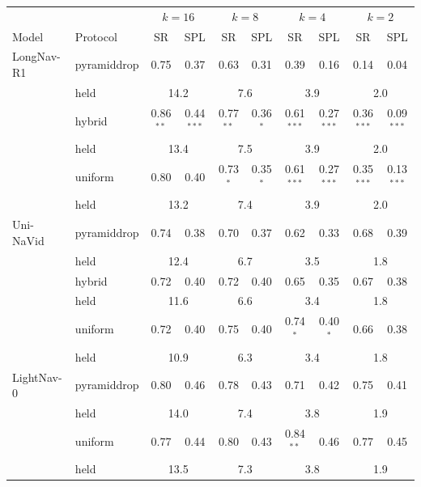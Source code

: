 \begin{tabular}{llcccccccc}
\toprule
 & & \multicolumn{2}{c}{$k=16$} & \multicolumn{2}{c}{$k=8$} & \multicolumn{2}{c}{$k=4$} & \multicolumn{2}{c}{$k=2$} \\
Model & Protocol & SR & SPL & SR & SPL & SR & SPL & SR & SPL \\
\midrule
LongNav-R1 & pyramiddrop & 0.75 & 0.37 & 0.63 & 0.31 & 0.39 & 0.16 & 0.14 & 0.04 \\
 & \quad held & \multicolumn{2}{c}{14.2} & \multicolumn{2}{c}{7.6} & \multicolumn{2}{c}{3.9} & \multicolumn{2}{c}{2.0} \\
 & hybrid & 0.86$^{**}$ & 0.44$^{***}$ & 0.77$^{**}$ & 0.36$^{*}$ & 0.61$^{***}$ & 0.27$^{***}$ & 0.36$^{***}$ & 0.09$^{***}$ \\
 & \quad held & \multicolumn{2}{c}{13.4} & \multicolumn{2}{c}{7.5} & \multicolumn{2}{c}{3.9} & \multicolumn{2}{c}{2.0} \\
 & uniform & 0.80 & 0.40 & 0.73$^{*}$ & 0.35$^{*}$ & 0.61$^{***}$ & 0.27$^{***}$ & 0.35$^{***}$ & 0.13$^{***}$ \\
 & \quad held & \multicolumn{2}{c}{13.2} & \multicolumn{2}{c}{7.4} & \multicolumn{2}{c}{3.9} & \multicolumn{2}{c}{2.0} \\
\midrule
Uni-NaVid & pyramiddrop & 0.74 & 0.38 & 0.70 & 0.37 & 0.62 & 0.33 & 0.68 & 0.39 \\
 & \quad held & \multicolumn{2}{c}{12.4} & \multicolumn{2}{c}{6.7} & \multicolumn{2}{c}{3.5} & \multicolumn{2}{c}{1.8} \\
 & hybrid & 0.72 & 0.40 & 0.72 & 0.40 & 0.65 & 0.35 & 0.67 & 0.38 \\
 & \quad held & \multicolumn{2}{c}{11.6} & \multicolumn{2}{c}{6.6} & \multicolumn{2}{c}{3.4} & \multicolumn{2}{c}{1.8} \\
 & uniform & 0.72 & 0.40 & 0.75 & 0.40 & 0.74$^{*}$ & 0.40$^{*}$ & 0.66 & 0.38 \\
 & \quad held & \multicolumn{2}{c}{10.9} & \multicolumn{2}{c}{6.3} & \multicolumn{2}{c}{3.4} & \multicolumn{2}{c}{1.8} \\
\midrule
LightNav-0 & pyramiddrop & 0.80 & 0.46 & 0.78 & 0.43 & 0.71 & 0.42 & 0.75 & 0.41 \\
 & \quad held & \multicolumn{2}{c}{14.0} & \multicolumn{2}{c}{7.4} & \multicolumn{2}{c}{3.8} & \multicolumn{2}{c}{1.9} \\
 & uniform & 0.77 & 0.44 & 0.80 & 0.43 & 0.84$^{**}$ & 0.46 & 0.77 & 0.45 \\
 & \quad held & \multicolumn{2}{c}{13.5} & \multicolumn{2}{c}{7.3} & \multicolumn{2}{c}{3.8} & \multicolumn{2}{c}{1.9} \\
\bottomrule
\end{tabular}
